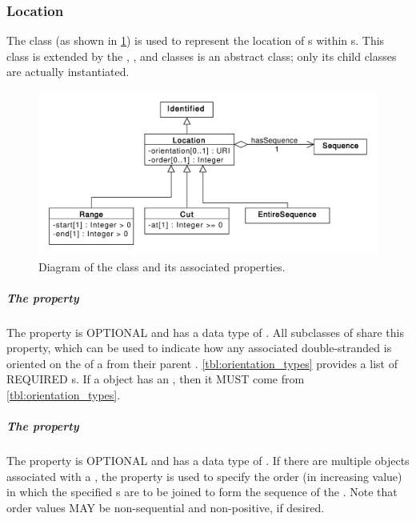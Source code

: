 \subsubsection{Location}
\label{sec:Location}

The  class (as shown in \ref{uml:location}) is used to represent the location of s within s.  This class is extended by the , , and  classes
 is an abstract class; only its child classes are actually instantiated.

\begin{figure}[ht]
\begin{center}
\includegraphics[scale=0.6]{uml/location}
\caption[]{Diagram of the  class and its associated properties.}
\label{uml:location}
\end{center}
\end{figure} 

\subparagraph{The  property}
\label{sec:orientation:L}
The  property is OPTIONAL and has a data type of . All subclasses of  share this property, which can be used to indicate how any associated double-stranded  is oriented on the  of a  from their parent . \ref{tbl:orientation_types} provides a list of REQUIRED  s. If a  object has an , then it MUST come from \ref{tbl:orientation_types}.

\subparagraph{The  property}
\label{sec:order}
The  property is OPTIONAL and has a data type of .  If there are multiple  objects associated with a , the  property is used to specify the order (in increasing value) in which the specified s are to be joined to form the sequence of the .
Note that order values MAY be non-sequential and non-positive, if desired.

